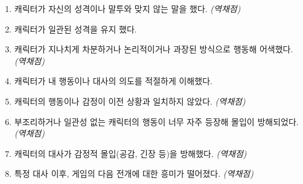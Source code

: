 \documentclass[12pt]{article}
\begin{document}
\begin{enumerate}[resume]
    \item 캐릭터가 자신의 성격이나 말투와 맞지 않는 말을 했다. \textit{(역채점)}
    \item 캐릭터가 일관된 성격을 유지 했다.
    \item 캐릭터가 지나치게 차분하거나 논리적이거나 과장된 방식으로 행동해 어색했다. \textit{(역채점)}
    \item 캐릭터가 내 행동이나 대사의 의도를 적절하게 이해했다.
    \item 캐릭터의 행동이나 감정이 이전 상황과 일치하지 않았다. \textit{(역채점)}
    \item 부조리하거나 일관성 없는 캐릭터의 행동이 너무 자주 등장해 몰입이 방해되었다. \textit{(역채점)}
    \item 캐릭터의 대사가 감정적 몰입(공감, 긴장 등)을 방해했다. \textit{(역채점)}
    \item 특정 대사 이후, 게임의 다음 전개에 대한 흥미가 떨어졌다. \textit{(역채점)}
\end{enumerate}
\end{document}
